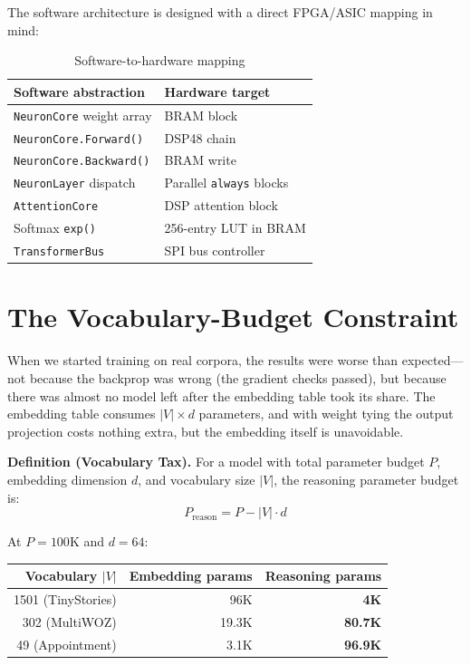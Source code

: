 \documentclass[11pt]{article}
\begin{document}
The software architecture is designed with a direct FPGA/ASIC mapping in mind:

\begin{table}[ht]
\centering
\begin{tabular}{ll}
\toprule
Software abstraction & Hardware target \\
\midrule
\texttt{NeuronCore} weight array & BRAM block \\
\texttt{NeuronCore.Forward()} & DSP48 chain \\
\texttt{NeuronCore.Backward()} & BRAM write \\
\texttt{NeuronLayer} dispatch & Parallel \texttt{always} blocks \\
\texttt{AttentionCore} & DSP attention block \\
Softmax \texttt{exp()} & 256-entry LUT in BRAM \\
\texttt{TransformerBus} & SPI bus controller \\
\bottomrule
\end{tabular}
\caption{Software-to-hardware mapping}
\end{table}

\section{The Vocabulary-Budget Constraint}

\label{sec:vocab}

When we started training on real corpora, the results were worse than expected---
not because the backprop was wrong (the gradient checks passed), but because there
was almost no model left after the embedding table took its share. The embedding
table consumes $|V| \times d$ parameters, and with weight tying the output projection
costs nothing extra, but the embedding itself is unavoidable.

\textbf{Definition (Vocabulary Tax).} For a model with total parameter budget $P$,
embedding dimension $d$, and vocabulary size $|V|$, the reasoning parameter budget is:
\begin{equation}
P_{\text{reason}} = P - |V| \cdot d
\label{eq:vocab-tax}
\end{equation}

At $P = 100$K and $d = 64$:
\begin{center}
\begin{tabular}{rrr}
\toprule
Vocabulary $|V|$ & Embedding params & Reasoning params \\
\midrule
1501 (TinyStories) & 96K & \textbf{4K} \\
302 (MultiWOZ) & 19.3K & \textbf{80.7K} \\
49 (Appointment) & 3.1K & \textbf{96.9K} \\
\bottomrule
\end{tabular}
\end{center}
\end{document}
